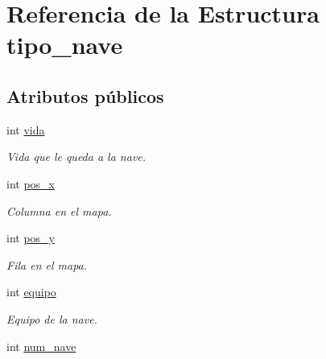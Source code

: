 \hypertarget{structtipo__nave}{}\section{Referencia de la Estructura tipo\+\_\+nave}
\label{structtipo__nave}
\subsection*{Atributos públicos}
\begin{DoxyCompactItemize}
\item 
\mbox{\label{structtipo__nave_a319f01d0152cadf2b976ef51c93ff7ae}} 
int \hyperlink{structtipo__nave_a319f01d0152cadf2b976ef51c93ff7ae}{vida}
\begin{DoxyCompactList}\small\item\em Vida que le queda a la nave. \end{DoxyCompactList}\item 
\mbox{\label{structtipo__nave_ae3a263a841c045b4de31b2e4a3838fc1}} 
int \hyperlink{structtipo__nave_ae3a263a841c045b4de31b2e4a3838fc1}{pos\+\_\+x}
\begin{DoxyCompactList}\small\item\em Columna en el mapa. \end{DoxyCompactList}\item 
\mbox{\label{structtipo__nave_a6c502ff05341d19b9f00c83730121bfe}} 
int \hyperlink{structtipo__nave_a6c502ff05341d19b9f00c83730121bfe}{pos\+\_\+y}
\begin{DoxyCompactList}\small\item\em Fila en el mapa. \end{DoxyCompactList}\item 
\mbox{\label{structtipo__nave_a9cef996f47c2096f5ee3752c26adde97}} 
int \hyperlink{structtipo__nave_a9cef996f47c2096f5ee3752c26adde97}{equipo}
\begin{DoxyCompactList}\small\item\em Equipo de la nave. \end{DoxyCompactList}\item 
\mbox{\label{structtipo__nave_a4e63a4af5631f52382dae374ef4f9760}} 
int \hyperlink{structtipo__nave_a4e63a4af5631f52382dae374ef4f9760}{num\+\_\+nave}

\end{DoxyCompactItemize}
